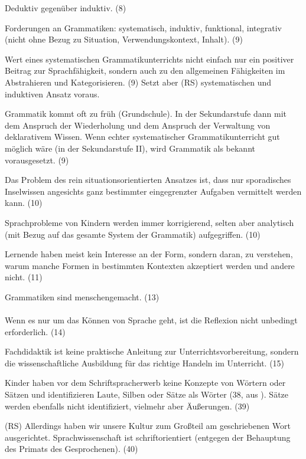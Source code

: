 Deduktiv gegenüber induktiv. (8)

Forderungen an Grammatiken: systematisch, induktiv, funktional, integrativ (nicht ohne Bezug zu Situation, Verwendungskontext, Inhalt). (9)

Wert eines systematischen Grammatikunterrichts nicht einfach nur ein positiver Beitrag zur Sprachfähigkeit, sondern auch zu den allgemeinen Fähigkeiten im Abstrahieren und Kategorisieren. (9) Setzt aber (RS) systematischen und induktiven Ansatz voraus.

Grammatik kommt oft zu früh (Grundschule).
In der Sekundarstufe dann mit dem Anspruch der Wiederholung und dem Anspruch der Verwaltung von deklarativem Wissen.
Wenn echter systematischer Grammatikunterricht gut möglich wäre (in der Sekundarstufe II), wird Grammatik als bekannt vorausgesetzt. (9)

Das Problem des rein situationsorientierten Ansatzes ist, dass nur sporadisches Inselwissen angesichts ganz bestimmter eingegrenzter Aufgaben vermittelt werden kann. (10)

Sprachprobleme von Kindern werden immer korrigierend, selten aber analytisch (mit Bezug auf das gesamte System der Grammatik) aufgegriffen. (10)

Lernende haben meist kein Interesse an der Form, sondern daran, zu verstehen, warum manche Formen in bestimmten Kontexten akzeptiert werden und andere nicht. (11)

Grammatiken sind menschengemacht. (13)



\paragraph{\citet{Bredel2013}}

Wenn es nur um das Können von Sprache geht, ist die Reflexion nicht unbedingt erforderlich. (14)

Fachdidaktik ist keine praktische Anleitung zur Unterrichtsvorbereitung, sondern die wissenschaftliche Ausbildung für das richtige Handeln im Unterricht. (15)


Kinder haben vor dem Schriftspracherwerb keine Konzepte von Wörtern oder Sätzen und identifizieren Laute, Silben oder Sätze als Wörter (38, aus \citealt{SteinigHuneke2002}).
Sätze werden ebenfalls nicht identifiziert, vielmehr aber Äußerungen. (39)

(RS) Allerdings haben wir unsere Kultur zum Großteil am geschriebenen Wort ausgerichtet.
Sprachwissenschaft ist schriftorientiert (entgegen der Behauptung des Primats des Gesprochenen). (40)

